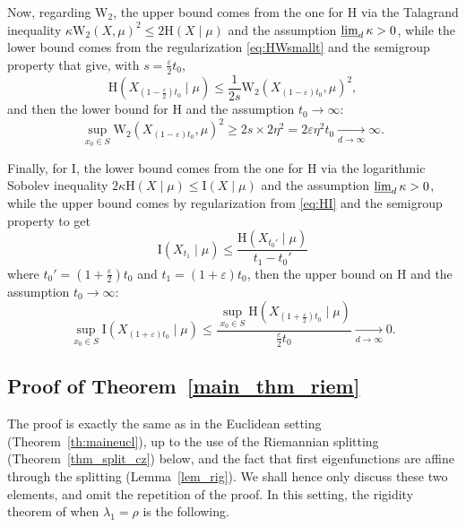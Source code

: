 \documentclass[10pt,reqno]{amsart}
\numberwithin{equation}{section}
\begin{document}
Now, regarding $\mathrm{W}_2$, the upper bound comes from the one for
$\mathrm{H}$ via the Talagrand inequality
$\kappa\mathrm{W}_2(X,\mu)^2 \leq 2\mathrm{H}(X\mid\mu)$ and the assumption
$\varliminf_d\kappa>0$, while the lower bound comes from the regularization
\eqref{eq:HWsmallt} and the semigroup property that give, with
$s=\frac{\varepsilon}{2}t_0$,
\begin{equation}
  \mathrm{H}(X_{(1-\frac{\varepsilon}{2})t_0}\mid\mu)
  \leq\frac{1}{2s}\mathrm{W}_2(X_{(1-\varepsilon)t_0},\mu)^2,
\end{equation}
and then the lower bound for $\mathrm{H}$ and the assumption $t_0\to\infty$:
\begin{equation}
  \sup_{x_0\in S}\mathrm{W}_2(X_{(1-\varepsilon)t_0},\mu)^2
  \geq2s\times 2\eta^2=2\varepsilon\eta^2t_0\xrightarrow[d\to\infty]{}\infty.
\end{equation}
     
Finally, for $\mathrm{I}$, the lower bound comes from the one for $\mathrm{H}$
via the logarithmic Sobolev inequality
$2\kappa\mathrm{H}(X\mid\mu) \leq \mathrm{I}(X\mid \mu)$ and the assumption
$\varliminf_d\kappa>0$, while the upper bound comes by regularization from
\eqref{eq:HI} and the semigroup property to get
\begin{equation}
  \mathrm{I}(X_{t_1}\mid\mu)
  \leq\frac{\mathrm{H}(X_{t_0'}\mid\mu)}{t_1-t_0'}
\end{equation}
where $t_0'=(1+\frac{\varepsilon}{2})t_0$ and $t_1=(1+\varepsilon)t_0$, then
the upper bound on $\mathrm{H}$ and the assumption $t_0\to\infty$:
\begin{equation}
  \sup_{x_0\in S}\mathrm{I}(X_{(1+\varepsilon)t_0}\mid\mu)
  \leq\frac{\sup_{x_0\in
      S}\mathrm{H}(X_{(1+\frac{\varepsilon}{2})t_0}\mid\mu)}{\frac{\varepsilon}{2}t_0}
  \xrightarrow[d\to\infty]{}0.
\end{equation}

\subsection{Proof of Theorem~\ref{main_thm_riem}}
\label{se:riemann}

The proof is exactly the same as in the Euclidean setting
(Theorem~\ref{th:maineucl}), up to the use of the Riemannian splitting
(Theorem~\ref{thm_split_cz}) below, and the fact that first eigenfunctions are
affine through the splitting (Lemma~\ref{lem_rig}). We shall hence only
discuss these two elements, and omit the repetition of the proof. In this
setting, the rigidity theorem of \cite{CZ17} when $\lambda_1 = \rho$ is the
following.
 
\end{document}
